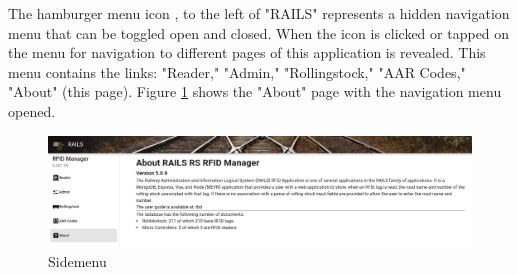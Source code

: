 The hamburger menu icon \hamburger, to the left of "RAILS" represents a hidden navigation menu that can be toggled open and closed. 
When the icon is clicked or tapped on the menu for navigation to different pages of this application is revealed. This menu  
contains the links: "Reader," "Admin," "Rollingstock," "AAR Codes," "About" (this page). 
Figure \ref{fig:about2} shows the "About" page with the navigation menu opened.

\begin{figure}[H]
    \centering
    \includegraphics[scale=0.33]{./images/about-sidemenu.png}
    \caption{Sidemenu}
    \label{fig:about2}
\end{figure}

